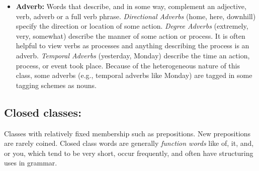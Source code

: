 \documentclass[11pt]{article}
\begin{document}
\begin{itemize}
		\item \textbf{Adverb:} Words that describe, and in some way, complement an adjective, verb, adverb or a full verb
			phrase. \textit{Directional Adverbs} (home, here, downhill) specify the direction or location of some action. 
			\textit{Degree Adverbs} (extremely, very, somewhat) describe the manner of some action or process. It is often
			helpful to view verbs as processes and anything describing the process is an adverb. \textit{Temporal Adverbs}
			(yesterday, Monday) describe the time an action, process, or event took place. Because of the heterogeneous 
			nature of this class, some adverbs (e.g., temporal adverbs like Monday) are tagged in some tagging schemes as			nouns.
		
		
	\end{itemize}
	
	\subsection*{Closed classes:} Classes with relatively fixed membership such as prepositions. New
	prepositions are rarely coined. Closed class words are generally \textit{function words}  like of, it, 
	and, or you, which tend to be very short, occur frequently, and often have structuring uses in grammar. 
	
\end{document}
